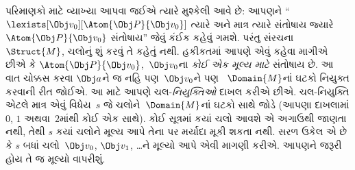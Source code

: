 પરિમાણકો માટે વ્યાખ્યા આપવા જઈએ ત્યારે મુશ્કેલી આવે છે: આપણને
``$\lexists[\Obj v_0][\Atom{\Obj P}{\Obj v_0}]$ ત્યારે અને માત્ર
ત્યારે સંતોષાય જ્યારે $\Atom{\Obj P}{\Obj v_0}$ સંતોષાય'' જેવું કંઈક
કહેવું ગમશે. પરંતુ સંરચના~$\Struct{M}$, ચલોનું શું
કરવું તે કહેતું નથી. હકીકતમાં આપણે એવું કહેવા માગીએ છીએ કે
$\Atom{\Obj P}{\Obj v_0}$,~$\Obj v_0$ના \emph{કોઈ એક મૂલ્ય માટે}
સંતોષાય છે. આ વાત ચોક્કસ કરવા $\Obj a$ને જ નહિ પણ~$\Obj v_0$ને પણ
~$\Domain{M}$નાં ઘટકો નિયુક્ત કરવાની રીત જોઈએ. આ માટે આપણે
ચલ-\emph{નિયુક્તિઓ} દાખલ કરીએ છીએ. ચલ-નિયુક્તિ
એટલે માત્ર એવું વિધેય~$s$ જે ચલોને~$\Domain{M}$નાં
ઘટકો સાથે જોડે (આપણા દાખલામાં $0$, $1$ અથવા~$2$માંથી કોઈ એક
સાથે). કોઈ સૂત્રમાં કયાં ચલો આવશે એ અગાઉથી જાણતા નથી,
તેથી $s$ કયાં ચલોને મૂલ્ય આપે તેના પર મર્યાદા મૂકી શકતા નથી.
સરળ ઉકેલ એ છે કે $s$ બધાં ચલો~$\Obj v_0$, $\Obj v_1$,
\dots{}ને મૂલ્યો આપે એવી માગણી કરીએ\@. આપણને જરૂરી હોય તે જ મૂલ્યો
વાપરીશું.


